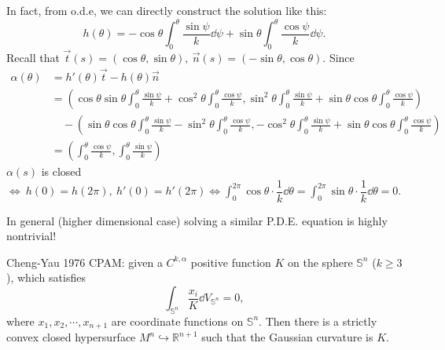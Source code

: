In fact, from o.d.e, we can directly construct the solution like this:
\[
    h(\theta)=-\cos\theta \int_0^\theta \frac{\sin \psi}{k}\dd \psi
    +\sin\theta \int_0^\theta \frac{\cos \psi}{k}\dd \psi  
.\]
Recall that $\vec{t}(s)=(\cos\theta,\sin\theta),~\vec{n}(s)=(-\sin \theta,\cos\theta).$
Since {\small
\begin{align*}
    \alpha(\theta)&=h'(\theta)\vec{t}-h(\theta)\vec{n}\\
    &=\left(
        \cos\theta\sin\theta\int_0^\theta\frac{\sin\psi}{k}
        +\cos^2\theta\int_0^\theta\frac{\cos\psi}{k},
        \sin^2\theta\int_0^\theta\frac{\sin\psi}{k}
        +\sin\theta\cos\theta\int_0^\theta\frac{\cos\psi}{k}
    \right)\\
    &\quad-\left( 
        \sin\theta\cos\theta\int_0^\theta\frac{\sin\psi}{k}
        -\sin^2\theta\int_0^\theta\frac{\cos\psi}{k},
        -\cos^2\theta\int_0^\theta\frac{\sin\psi}{k}
        +\sin\theta\cos\theta\int_0^\theta\frac{\cos\psi}{k}
    \right)\\
    &=\left(
        \int_0^\theta\frac{\cos\psi}{k},
        \int_0^\theta\frac{\sin\psi}{k}
    \right)
\end{align*}
}
$\alpha(s)$ is closed $\Leftrightarrow~h(0)=h(2\pi),~h'(0)=h'(2\pi)
\Leftrightarrow \int_0^{2\pi}\cos\theta\cdot\dfrac{1}{k}\dd \theta
=\int_0^{2\pi}\sin\theta\cdot\dfrac{1}{k}\dd \theta
=0$.
\begin{remark}
    In general (higher dimensional case) solving a similar P.D.E. equation is highly nontrivial!
    
    Cheng-Yau 1976 CPAM: given a $C^{k,\alpha}$ positive function $K$ on the
    sphere $\mathbb{S}^n$ ($k\ge 3$), which satisfies
    \[
    \int_{\mathbb{S}^n}\frac{x_i}{K}\dd V_{\mathbb{S}^n}=0
    ,\]
    where $x_1,x_2,\cdots,x_{n+1}$ are coordinate functions on 
    $\mathbb{S}^n$. 
    Then there is a strictly convex closed 
    hypersurface $M^n \hookrightarrow \mathbb{R}^{n+1}$ such
    that the Gaussian curvature is $K$.
\end{remark} 
